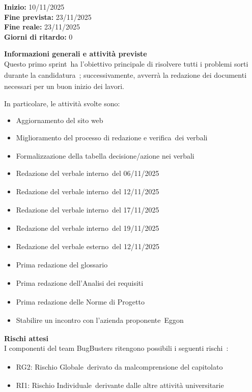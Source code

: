 \documentclass[a4paper,12pt]{article}
\newcommand{\pediceG}{\texorpdfstring{\textsubscript{\scalebox{0.6}{\textbf{G}}}~}{G}}
\begin{document}
\textbf{Inizio:} 10/11/2025 \\
\textbf{Fine prevista:} 23/11/2025 \\
\textbf{Fine reale:} 23/11/2025 \\
\textbf{Giorni di ritardo:} 0

\noindent\textbf{Informazioni generali e attività previste}\\
Questo primo sprint\pediceG ha l'obiettivo principale di risolvere tutti i problemi sorti durante la candidatura\pediceG; successivamente, avverrà la redazione dei documenti necessari per un buon inizio dei lavori.

In particolare, le attività svolte sono:
\begin{itemize}
    \item Aggiornamento del sito web
    \item Miglioramento del processo di redazione e verifica\pediceG dei verbali
    \item Formalizzazione della tabella decisione/azione nei verbali
    \item Redazione del verbale interno\pediceG del 06/11/2025
    \item Redazione del verbale interno\pediceG del 12/11/2025
    \item Redazione del verbale interno\pediceG del 17/11/2025
    \item Redazione del verbale interno\pediceG del 19/11/2025
    \item Redazione del verbale esterno\pediceG del 12/11/2025
    \item Prima redazione del glossario\pediceG
    \item Prima redazione dell'Analisi dei requisiti\pediceG
    \item Prima redazione delle Norme di Progetto\pediceG
    \item Stabilire un incontro con l'azienda proponente\pediceG Eggon
\end{itemize}

\noindent\textbf{Rischi attesi}\\
I componenti del team BugBusters ritengono possibili i seguenti rischi\pediceG:
\begin{itemize}
    \item RG2: Rischio Globale\pediceG derivato da malcomprensione del capitolato\pediceG
    \item RI1: Rischio Individuale\pediceG derivante dalle altre attività universitarie
\end{itemize}
\end{document}
